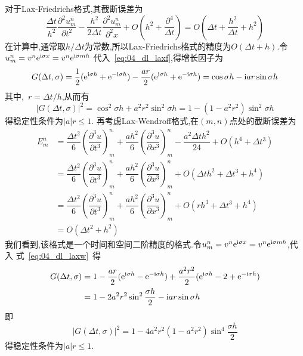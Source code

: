 对于Lax-Friedrichs格式,其截断误差为
\begin{equation}
\dfrac{\Delta t}{h^2}\dfrac{\partial^2u_m^n}{\partial t^2}-\dfrac{h^2}{2\Delta t}\dfrac{\partial^2
u_m^n}{\partial^2 x}+O(h^2+\dfrac{\partial^4}{\Delta t})=O(\Delta t+\dfrac{h^2}{\Delta t}+h^2)
\end{equation}
在计算中,通常取$h/\Delta t$为常数,所以Lax-Friedrichs格式的精度为$O(\Delta t+h)$.令$u_m^n=v^n\mathrm{e}^{\mathrm{i}\sigma x}=v^n\mathrm{e}^{\mathrm{i}\sigma mh}$
代入~\eqref{eq:04_dl_laxf},得增长因子为
\begin{equation}
G(\Delta t,\sigma)=\dfrac{1}{2}(\mathrm{e}^{\mathrm{i}\sigma h}+\mathrm{e}^{-\mathrm{i}\sigma h})-\dfrac{ar}{2}(\mathrm{e}^{\mathrm{i}\sigma h}+\mathrm{e}^{-\mathrm{i}\sigma h})
=\cos\sigma h -\mathrm{i} ar\sin\sigma h
\end{equation}
其中,~$r=\Delta t/h$,从而有
\begin{equation}
|G(\Delta t,\sigma)|^2=\cos^2 \sigma h + a^2r^2\sin^2\sigma h=1-(1-a^2 r^2)\sin^2\sigma h
\end{equation}
得稳定性条件为$|a|r\leq1$.
再考虑Lax-Wendroff格式,在$(m,n)$点处的截断误差为
\begin{equation}
\begin{split}
E_m^n &=\dfrac{\Delta t^2}{6}\left(\dfrac{\partial^3 u}{\partial t^3}\right)_m^n+
	\dfrac{ah^2}{6}\left(\dfrac{\partial^3 u}{\partial x^3}\right)_m^n-
	\dfrac{a^2\Delta t h^2}{24}+O(h^4+\Delta t^3) \\
      &=\dfrac{\Delta t^2}{6}\left(\dfrac{\partial^3 u}{\partial t^3}\right)_m^n+
	\dfrac{ah^2}{6}\left(\dfrac{\partial^3 u}{\partial x^3}\right)_m^n+
	O(\Delta th^2+\Delta t^3+h^4) \\
      &=\dfrac{\Delta t^2}{6}\left(\dfrac{\partial^3 u}{\partial t^3}\right)_m^n+
	\dfrac{ah^2}{6}\left(\dfrac{\partial^3 u}{\partial x^3}\right)_m^n+
	O(rh^3+\Delta t^3+h^4) \\
      &=O(\Delta t^2+h^2)
\end{split}
\end{equation}
我们看到,该格式是一个时间和空间二阶精度的格式.令$u_m^n=v^n\mathrm{e}^{\mathrm{i}\sigma x}=v^n\mathrm{e}^{\mathrm{i}\sigma mh}$,代入
式~\eqref{eq:04_dl_laxw}~得
\begin{equation}
\begin{split}
G(\Delta t,\sigma) &= 1-\dfrac{ar}{2}(\mathrm{e}^{\mathrm{i}\sigma h}-\mathrm{e}^{-\mathrm{i}\sigma h})+\dfrac{a^2r^2}{2}
(\mathrm{e}^{\mathrm{i}\sigma h}-2+\mathrm{e}^{-\mathrm{i}\sigma h}) \\
&= 1-2a^2 r^2 \sin^2\dfrac{\sigma h}{2}-\mathrm{i} ar\sin\sigma h
\end{split}
\end{equation}
即
\begin{equation}
|G(\Delta t,\sigma)|^2=1-4a^2 r^2(1-a^2r^2)\sin^4\dfrac{\sigma h}{2}
\end{equation}
得稳定性条件为$|a|r\leq 1$.
